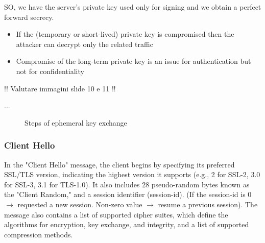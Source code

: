 SO, we have the server’s private key used only for signing and we obtain
a perfect forward secrecy. \\
\begin{itemize}[itemsep=0pt]
    \item  If the (temporary or short-lived) private key is compromised
          then the attacker can decrypt only the related traffic
    \item Compromise of the long-term private key is an issue for
          authentication but not for confidentiality
\end{itemize}

!! Valutare immagini slide 10 e 11 !!

...

\begin{figure}[ht]
    \centering
    \hfill
    \caption{Steps of ephemeral key exchange}
    \label{fig:two_images}
\end{figure}

\subsubsection{Client Hello}

In the "Client Hello" message, the client begins by specifying its preferred SSL/TLS version, indicating the highest version it supports (e.g., 2 for SSL-2, 3.0 for SSL-3, 3.1 for TLS-1.0). It also includes 28 pseudo-random bytes known as the "Client Random," and a session identifier (session-id). (If the session-id is 0 $\rightarrow$ requested a new session. Non-zero value $\rightarrow$ resume a previous session). The message also contains a list of supported cipher suites, which define the algorithms for encryption, key exchange, and integrity, and a list of supported compression methods.

